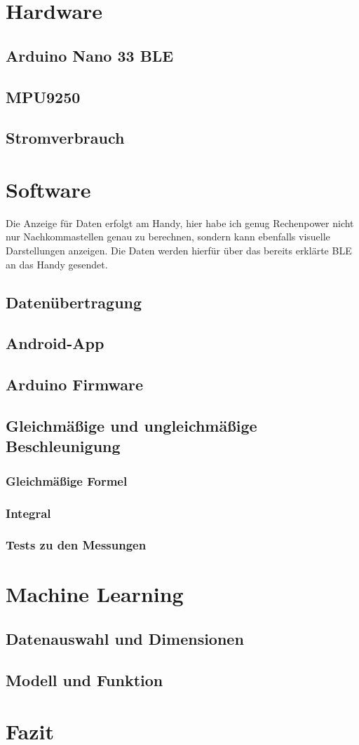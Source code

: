 \documentclass[12pt,titlepage]{scrreprt}
\begin{document}
\chapter{Hardware}
\section{Arduino Nano 33 BLE}

\section{MPU9250}

\section{Stromverbrauch}


\chapter{Software}
Die Anzeige für Daten erfolgt am Handy, hier habe ich genug Rechenpower
nicht nur Nachkommastellen genau zu berechnen, sondern kann ebenfalls 
visuelle Darstellungen anzeigen. Die Daten werden hierfür über das bereits
erklärte BLE an das Handy gesendet.
\section{Datenübertragung}

\section{Android-App}

\section{Arduino Firmware}

\section{Gleichmäßige und ungleichmäßige Beschleunigung}

\subsection{Gleichmäßige Formel}

\subsection{Integral}

\subsection{Tests zu den Messungen}


\chapter{Machine Learning}
\section{Datenauswahl und Dimensionen}

\section{Modell und Funktion}


\chapter{Fazit}




\end{document}
